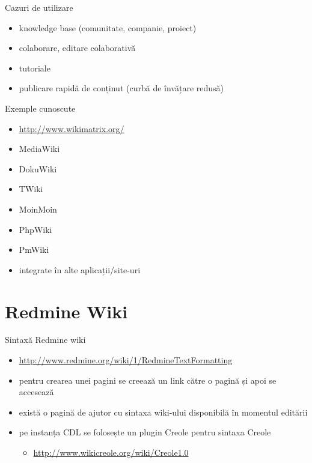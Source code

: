 \documentclass{beamer}
\begin{document}
\begin{frame}{Cazuri de utilizare}
  \begin{itemize}
    \item knowledge base (comunitate, companie, proiect)
    \item colaborare, editare colaborativă
    \item tutoriale
    \item publicare rapidă de conținut (curbă de învățare redusă)
  \end{itemize}
\end{frame}

\begin{frame}{Exemple cunoscute}
  \begin{itemize}
    \item \url{http://www.wikimatrix.org/}
    \item MediaWiki
    \item DokuWiki
    \item TWiki
    \item MoinMoin
    \item PhpWiki
    \item PmWiki
    \item integrate în alte aplicații/site-uri
  \end{itemize}
\end{frame}

\section{Redmine Wiki}

\begin{frame}{Sintaxă Redmine wiki}
  \begin{itemize}
    \item \url{http://www.redmine.org/wiki/1/RedmineTextFormatting}
    \item pentru crearea unei pagini se creează un link către o pagină și apoi
se accesează
    \item există o pagină de ajutor cu sintaxa wiki-ului disponibilă în
momentul editării
    \item pe instanța CDL se folosește un plugin Creole pentru sintaxa Creole
      \begin{itemize}
        \item \url{http://www.wikicreole.org/wiki/Creole1.0}
      \end{itemize}
  \end{itemize}
\end{frame}
\end{document}
